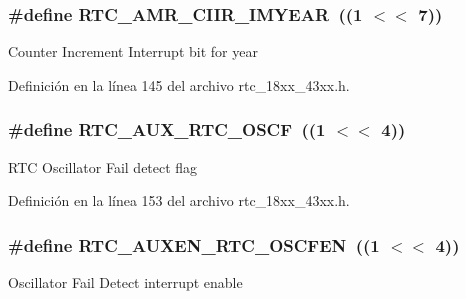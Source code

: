 \subsubsection[{\texorpdfstring{R\+T\+C\+\_\+\+A\+M\+R\+\_\+\+C\+I\+I\+R\+\_\+\+I\+M\+Y\+E\+AR}{RTC_AMR_CIIR_IMYEAR}}]{\setlength{\rightskip}{0pt plus 5cm}\#define R\+T\+C\+\_\+\+A\+M\+R\+\_\+\+C\+I\+I\+R\+\_\+\+I\+M\+Y\+E\+AR~((1 $<$$<$ 7))}\hypertarget{group___r_t_c__18_x_x__43_x_x_ga56b312d9e291685d843f6dae171f4441}{}\label{group___r_t_c__18_x_x__43_x_x_ga56b312d9e291685d843f6dae171f4441}
Counter Increment Interrupt bit for year 

Definición en la línea 145 del archivo rtc\+\_\+18xx\+\_\+43xx.\+h.

\subsubsection[{\texorpdfstring{R\+T\+C\+\_\+\+A\+U\+X\+\_\+\+R\+T\+C\+\_\+\+O\+S\+CF}{RTC_AUX_RTC_OSCF}}]{\setlength{\rightskip}{0pt plus 5cm}\#define R\+T\+C\+\_\+\+A\+U\+X\+\_\+\+R\+T\+C\+\_\+\+O\+S\+CF~((1 $<$$<$ 4))}\hypertarget{group___r_t_c__18_x_x__43_x_x_gaafb1215dfd0f9bbe198274689a1f1584}{}\label{group___r_t_c__18_x_x__43_x_x_gaafb1215dfd0f9bbe198274689a1f1584}
R\+TC Oscillator Fail detect flag 

Definición en la línea 153 del archivo rtc\+\_\+18xx\+\_\+43xx.\+h.

\subsubsection[{\texorpdfstring{R\+T\+C\+\_\+\+A\+U\+X\+E\+N\+\_\+\+R\+T\+C\+\_\+\+O\+S\+C\+F\+EN}{RTC_AUXEN_RTC_OSCFEN}}]{\setlength{\rightskip}{0pt plus 5cm}\#define R\+T\+C\+\_\+\+A\+U\+X\+E\+N\+\_\+\+R\+T\+C\+\_\+\+O\+S\+C\+F\+EN~((1 $<$$<$ 4))}\hypertarget{group___r_t_c__18_x_x__43_x_x_ga12b8af6f1d4757d19c1b09d85d3fc497}{}\label{group___r_t_c__18_x_x__43_x_x_ga12b8af6f1d4757d19c1b09d85d3fc497}
Oscillator Fail Detect interrupt enable 

